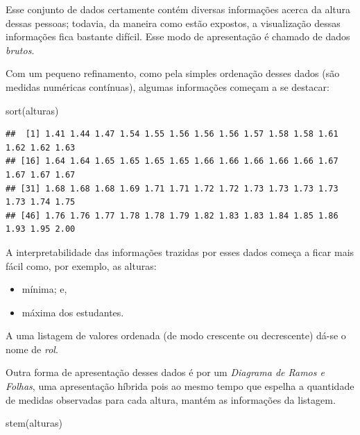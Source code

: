 \documentclass[
]{book}
\newenvironment{Shaded}{\begin{snugshade}}{\end{snugshade}}
\newcommand{\FunctionTok}[1]{\textcolor[rgb]{0.00,0.00,0.00}{#1}}
\newcommand{\NormalTok}[1]{#1}
\providecommand{\tightlist}{%
  \setlength{\itemsep}{0pt}\setlength{\parskip}{0pt}}
\begin{document}
Esse conjunto de dados certamente contém diversas informações acerca da altura dessas pessoas; todavia, da maneira como estão expostos, a visualização dessas informações fica bastante difícil. Esse modo de apresentação é chamado de dados \emph{brutos}.

\hfill\break

Com um pequeno refinamento, como pela simples ordenação desses dados (são medidas numéricas contínuas), algumas informações começam a se destacar:

\hfill\break

\begin{Shaded}
\begin{Highlighting}[]
\FunctionTok{sort}\NormalTok{(alturas)}
\end{Highlighting}
\end{Shaded}

\begin{verbatim}
##  [1] 1.41 1.44 1.47 1.54 1.55 1.56 1.56 1.56 1.57 1.58 1.58 1.61 1.62 1.62 1.63
## [16] 1.64 1.64 1.65 1.65 1.65 1.65 1.66 1.66 1.66 1.66 1.66 1.67 1.67 1.67 1.67
## [31] 1.68 1.68 1.68 1.69 1.71 1.71 1.72 1.72 1.73 1.73 1.73 1.73 1.73 1.74 1.75
## [46] 1.76 1.76 1.77 1.78 1.78 1.79 1.82 1.83 1.83 1.84 1.85 1.86 1.93 1.95 2.00
\end{verbatim}

\hfill\break

A interpretabilidade das informações trazidas por esses dados começa a ficar mais fácil como, por exemplo, as alturas:

\hfill\break

\begin{itemize}
\tightlist
\item
  mínima; e,
\item
  máxima dos estudantes.
\end{itemize}

\hfill\break

A uma listagem de valores ordenada (de modo crescente ou decrescente) dá-se o nome de \emph{rol}.

\hfill\break

Outra forma de apresentação desses dados é por um \emph{Diagrama de Ramos e Folhas}, uma apresentação híbrida pois ao mesmo tempo que espelha a quantidade de medidas observadas para cada altura, mantém as informações da listagem.

\hfill\break

\begin{Shaded}
\begin{Highlighting}[]
\FunctionTok{stem}\NormalTok{(alturas)}
\end{Highlighting}
\end{Shaded}
\end{document}
